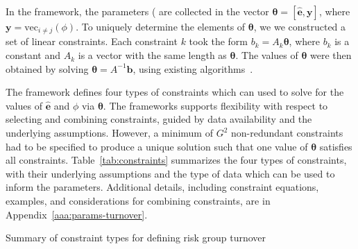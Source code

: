 In the framework,
the parameters (%
are collected in the vector   %
$\bm{\theta} = \left[\bm{\hat{e}}, \bm{y}\right]$,
where $\bm{y} = \mathrm{vec}_{i \ne j}(\phi)$.
To uniquely determine the elements of $\bm{\theta}$, we
we constructed a set of linear constraints.
Each constraint $k$ took the form		%
$b_k = A_k \bm{\theta}$,
where $b_k$ is a constant and $A_k$ is a vector with the same length as $\bm{\theta}$.
The values of $\bm{\theta}$ were then obtained by solving
$\bm{\theta} = A^{-1}\bm{b}$,
using existing algorithms~\citep{LAPACK}. %
\par
The framework defines four types of constraints which can used to
solve for the values of $\bm{\hat{e}}$ and $\phi$ via $\bm{\theta}$.
The frameworks supports flexibility with respect to selecting and combining
constraints, guided by data availability and the underlying assumptions.
However, a minimum of $G^2$ non-redundant constraints had to be specified
to produce a unique solution such that one value of $\bm{\theta}$ satisfies all constraints. %
Table~\ref{tab:constraints} summarizes 
the four types of constraints, with their underlying assumptions and the type of data which
can be used to inform the parameters.									%
Additional details, including
constraint equations, examples, and considerations for combining constraints,
are in Appendix~\ref{aaa:params-turnover}.%
\begin{table}
  \centering
  \caption{Summary of constraint types for defining risk group turnover}
  \label{tab:constraints}
  
\end{table}
